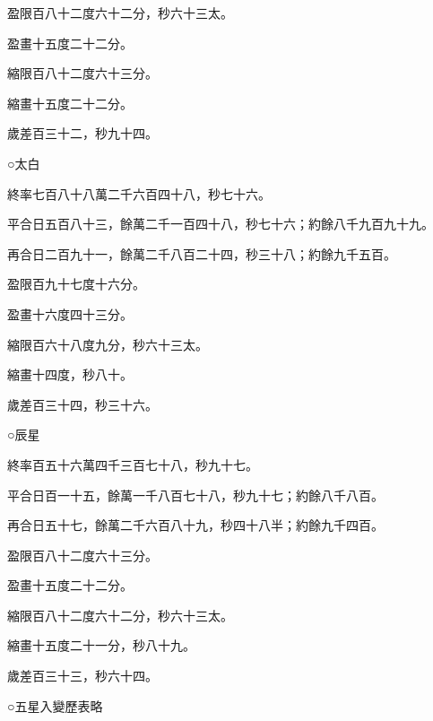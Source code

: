 \begin{pinyinscope}
 盈限百八十二度六十二分，秒六十三太。



 盈畫十五度二十二分。



 縮限百八十二度六十三分。



 縮畫十五度二十二分。



 歲差百三十二，秒九十四。



 ○太白



 終率七百八十八萬二千六百四十八，秒七十六。



 平合日五百八十三，餘萬二千一百四十八，秒七十六；約餘八千九百九十九。



 再合日二百九十一，餘萬二千八百二十四，秒三十八；約餘九千五百。



 盈限百九十七度十六分。



 盈畫十六度四十三分。



 縮限百六十八度九分，秒六十三太。



 縮畫十四度，秒八十。



 歲差百三十四，秒三十六。



 ○辰星



 終率百五十六萬四千三百七十八，秒九十七。



 平合日百一十五，餘萬一千八百七十八，秒九十七；約餘八千八百。



 再合日五十七，餘萬二千六百八十九，秒四十八半；約餘九千四百。



 盈限百八十二度六十三分。



 盈畫十五度二十二分。



 縮限百八十二度六十二分，秒六十三太。



 縮畫十五度二十一分，秒八十九。



 歲差百三十三，秒六十四。



 ○五星入變歷表略



\end{pinyinscope}